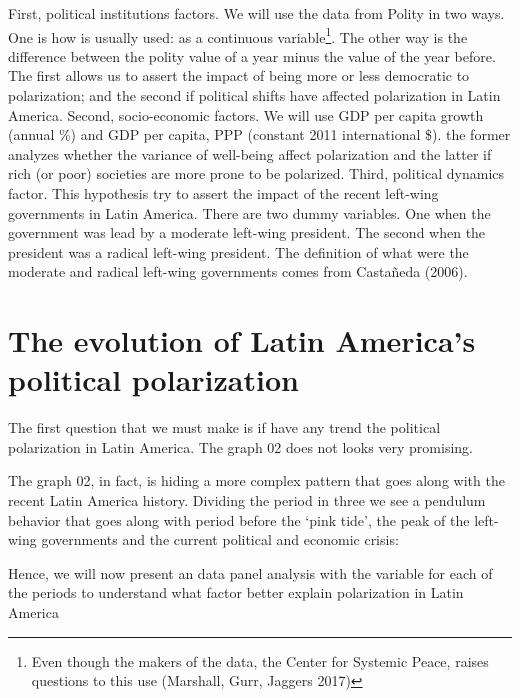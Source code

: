 \documentclass[10pt]{article}
\begin{document}
First, political institutions factors. We will use the data from Polity in two ways. One is how is usually used: as a continuous variable\footnote{Even though the makers of the data, the Center for Systemic Peace, raises questions to this use (Marshall, Gurr, Jaggers 2017)}. The other way is the difference between the polity value of a year minus the value of the year before. The first allows us to assert the impact of being more or less democratic to polarization; and the second if political shifts have affected polarization in Latin America. Second, socio-economic factors. We will use GDP per capita growth (annual \%) and GDP per capita, PPP (constant 2011 international \$). the former analyzes whether the variance of well-being affect polarization and the latter if rich (or poor) societies are more prone to be polarized. Third, political dynamics factor. This hypothesis try to assert the impact of the recent left-wing governments in Latin America. There are two dummy variables. One when the government was lead by a moderate left-wing president. The second when the president was a radical left-wing president. The definition of what were the moderate and radical left-wing governments comes from Casta\~{n}eda (2006).		

\section{The evolution of Latin America's political polarization}

The first question that we must make is if have any trend the political polarization in Latin America. The graph 02 does not looks very promising.


The graph 02, in fact, is hiding a more complex pattern that goes along with the recent Latin America history. Dividing the period in three we see a pendulum behavior that goes along with period before the `pink tide', the peak of the left-wing governments and the current political and economic crisis:


Hence, we will now present an data panel analysis with the variable for each of the periods to understand what factor better explain polarization in Latin America
\end{document}

